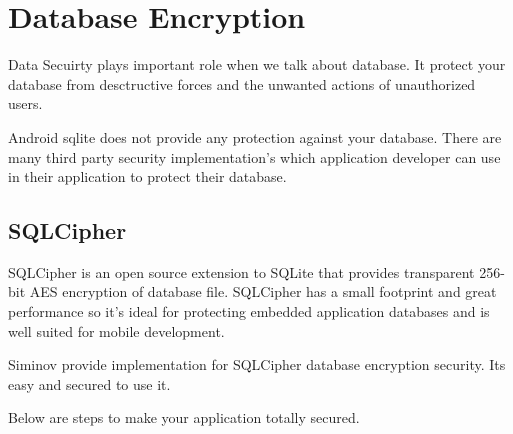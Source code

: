 \newpage
\chapter {\Large{Database Encryption}}
Data Secuirty plays important role when we talk about database. It protect your database from desctructive forces and the unwanted actions of unauthorized users.

\par
Android sqlite does not provide any protection against your database. There are many third party security implementation's which application developer can use in their application to protect their database.

\section{SQLCipher}
SQLCipher is an open source extension to SQLite that provides transparent 256-bit AES encryption of database file. SQLCipher has a small footprint and great performance so it's ideal for protecting embedded application databases and is well suited for mobile development.

\par
Siminov provide implementation for SQLCipher database encryption security. Its easy and secured to use it.

\par
Below are steps to make your application totally secured.


